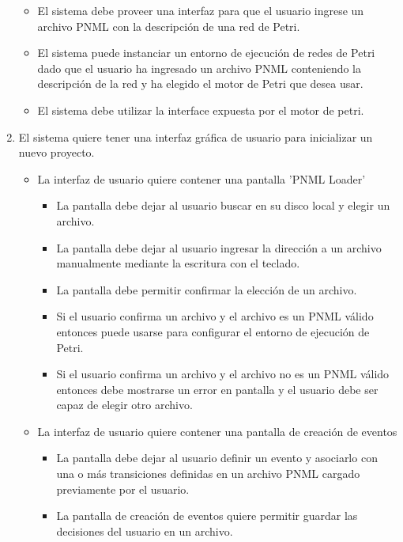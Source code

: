 \begin{enumerate}
	\begin{itemize}
	    \item El sistema debe proveer una interfaz para que el usuario ingrese un
	    archivo PNML con la descripción de una red de Petri.
	    \item El sistema puede instanciar un entorno de ejecución de redes de
	    Petri dado que el usuario ha ingresado un archivo PNML conteniendo la
	    descripción de la red y ha elegido el motor de Petri que desea usar.
	    \item El sistema debe utilizar la interface expuesta por el motor de
	    petri.
	\end{itemize}
	\item El sistema quiere tener una interfaz gráfica de usuario para inicializar
	un nuevo proyecto.
	\begin{itemize}
	    \item La interfaz de usuario quiere contener una pantalla 'PNML Loader'
	    	\begin{itemize}
	    	    \item La pantalla debe dejar al usuario buscar en su disco local y
	    	    elegir un archivo.
	    	    \item La pantalla debe dejar al usuario ingresar la dirección a un
	    	    archivo manualmente mediante la escritura con el teclado.
	    	    \item La pantalla debe permitir confirmar la elección de un archivo.
	    	    \item Si el usuario confirma un archivo y el archivo es un PNML válido
	    	    entonces puede usarse para configurar el entorno de ejecución de
	    	    Petri.
	    	    \item Si el usuario confirma un archivo y el archivo no es un PNML
	    	    válido entonces debe mostrarse un error en pantalla y el usuario debe
	    	    ser capaz de elegir otro archivo.
	    	\end{itemize}
	    \item La interfaz de usuario quiere contener una pantalla de creación de
	    eventos
	    \begin{itemize}
	    	    \item La pantalla debe dejar al usuario definir un evento y asociarlo
	    	    con una o más transiciones definidas en un archivo PNML cargado
	    	    previamente por el usuario.
	    	    \item La pantalla de creación de eventos quiere permitir guardar las
	    	    decisiones del usuario en un archivo.

\end{itemize}
\end{itemize}
\end{enumerate}
